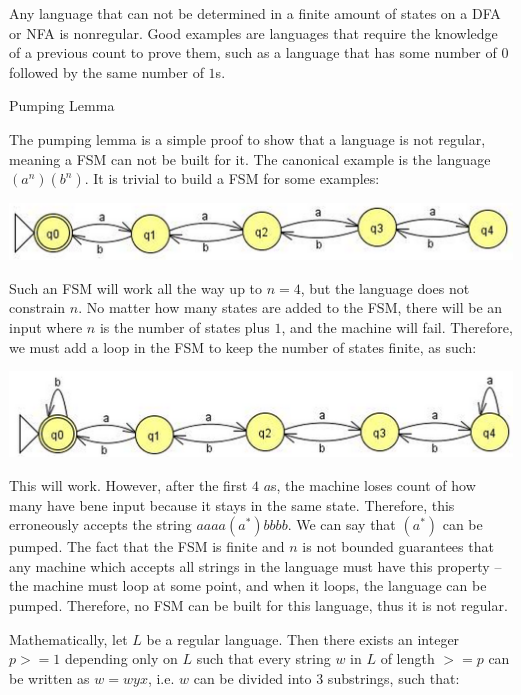 \documentclass[8pt]{scrartcl}
\makeatletter
\renewcommand{\subsection}{\@startsection{subsection}{2}{0mm}
                                {-1explus -.5ex minus -.2ex}
                                {0.5ex plus .2ex}
                                {\normalfont\normalsize\bfseries}}
\makeatother
\begin{document}
\begin{multicols}{6}
Any language that can not be determined in a finite amount of states on a DFA or NFA is nonregular. Good examples are languages that require the knowledge of a previous count to prove them, such as a language that has some number of $0$ followed by the same number of $1$s.

\subsection{Pumping Lemma}

The pumping lemma is a simple proof to show that a language is not regular, meaning a FSM can not be built for it. The canonical example is the language $(a^n)(b^n)$. It is trivial to build a FSM for some examples:

\includegraphics[scale=0.25]{simple_pumping_fsm.png}

Such an FSM will work all the way up to $n = 4$, but the language does not constrain $n$. No matter how many states are added to the FSM, there will be an input where $n$ is the number of states plus $1$, and the machine will fail. Therefore, we must add a loop in the FSM to keep the number of states finite, as such:

\includegraphics[scale=0.25]{loop_pumping_fsm.png}

This will work. However, after the first $4$ $a$s, the machine loses count of how many have bene input because it stays in the same state. Therefore, this erroneously accepts the string $aaaa(a^*)bbbb$. We can say that $(a^*)$ can be pumped. The fact that the FSM is finite and $n$ is not bounded guarantees that any machine which accepts all strings in the language must have this property -- the machine must loop at some point, and when it loops, the language can be pumped. Therefore, no FSM can be built for this language, thus it is not regular.

Mathematically, let $L$ be a regular language. Then there exists an integer $p >= 1$ depending only on $L$ such that every string $w$ in $L$ of length $>= p$ can be written as $w = wyx$, i.e. $w$ can be divided into 3 substrings, such that:


\end{multicols}
\end{document}
